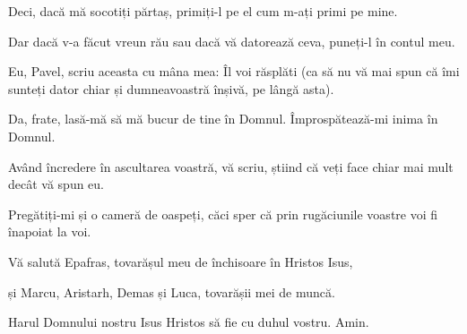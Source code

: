 {\par }{\PP {}Deci, dacă mă socotiți părtaș, primiți-l pe el cum m-ați primi pe mine.

Dar dacă v-a făcut vreun rău sau dacă vă datorează ceva, puneți-l în contul meu.

Eu, Pavel, scriu aceasta cu mâna mea: Îl voi răsplăti (ca să nu vă mai spun că îmi sunteți dator chiar și dumneavoastră înșivă, pe lângă asta).

Da, frate, lasă-mă să mă bucur de tine în Domnul. Împrospătează-mi inima în Domnul.


\par }{\PP {}Având încredere în ascultarea voastră, vă scriu, știind că veți face chiar mai mult decât vă spun eu.


\par }{\PP {}Pregătiți-mi și o cameră de oaspeți, căci sper că prin rugăciunile voastre voi fi înapoiat la voi.


\par }{\PP {}Vă salută Epafras, tovarășul meu de închisoare în Hristos Isus,

și Marcu, Aristarh, Demas și Luca, tovarășii mei de muncă.


\par }{\PP {}Harul Domnului nostru Isus Hristos să fie cu duhul vostru. Amin.


\par }